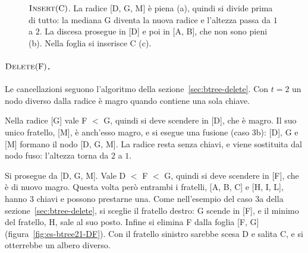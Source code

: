 \begin{figure}[htbp]
\caption{$\textsc{Insert}(\mathrm{C})$. La radice [D, G, M] è piena (a), quindi si divide prima di tutto: la mediana G diventa la nuova radice e l'altezza passa da $1$ a $2$. La discesa prosegue in [D] e poi in [A, B], che non sono pieni (b). Nella foglia si inserisce C (c).}
\label{fig:es-btree21-C}
\end{figure}

\paragraph{$\textsc{Delete}(\mathrm{F})$.}
Le cancellazioni seguono l'algoritmo della sezione~\ref{sec:btree-delete}. Con $t = 2$ un nodo diverso dalla radice è magro quando contiene una sola chiave.

Nella radice [G] vale F $<$ G, quindi si deve scendere in [D], che è magro. Il suo unico fratello, [M], è anch'esso magro, e si esegue una fusione (caso 3b): [D], G e [M] formano il nodo [D, G, M]. La radice resta senza chiavi, e viene sostituita dal nodo fuso: l'altezza torna da $2$ a $1$.

Si prosegue da [D, G, M]. Vale D $<$ F $<$ G, quindi si deve scendere in [F], che è di nuovo magro. Questa volta però entrambi i fratelli, [A, B, C] e [H, I, L], hanno $3$ chiavi e possono prestarne una. Come nell'esempio del caso 3a della sezione~\ref{sec:btree-delete}, si sceglie il fratello destro: G scende in [F], e il minimo del fratello, H, sale al suo posto. Infine si elimina F dalla foglia [F, G] (figura~\ref{fig:es-btree21-DF}). Con il fratello sinistro sarebbe scesa D e salita C, e si otterrebbe un albero diverso.


